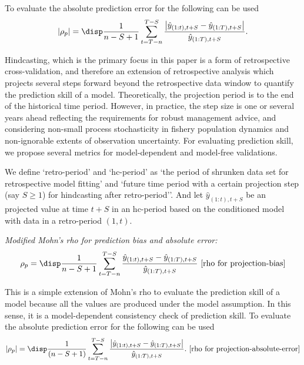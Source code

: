 To evaluate the absolute prediction error for the following can be used
\begin{equation}
\label{eqn:mohn3}
|\rho_p| = \disp \frac{1}{n-S+1} \sum_{t=T-n}^{T-S}
\frac{\left| \hat{y}_{(1:t),t+S}-\hat{y}_{(1:T),t+S} \right|}{\hat{y}_{(1:T),t+S}}. 
\end{equation} 

Hindcasting, which is the primary focus in this paper is a form of retrospective cross-validation, and therefore an extension of retrospective analysis which projects several steps forward beyond the retrospective data window to quantify the prediction skill of a model. Theoretically, the projection period is to the end of the historical time period. However, in practice, the step size is one or several years ahead reflecting the requirements for robust management advice, and considering non-small process stochasticity in fishery population dynamics and non-ignorable extents of observation uncertainty. For evaluating prediction skill, we propose several metrics for model-dependent and model-free validations.

We  define `retro-period' and `hc-period' as `the period of shrunken data set for retrospective model fitting' and `future time period with a certain projection step (say $S \geq 1$) for hindcasting after retro-period''. And let $\hat{y}_{(1:t),t+S}$ be an projected value at time $t+S$ in an hc-period based on the conditioned model with data in a retro-period $(1,t)$. 

\vspace{0.2cm} \noindent
{\it Modified Mohn's rho for prediction bias and absolute error:}\\
\begin{equation}
\label{eqn:mohn2}
\rho_p = \disp \frac{1}{n-S+1} \sum_{t=T-n}^{T-S} 
\frac{\hat{y}_{(1:t),t+S}-\hat{y}_{(1:T),t+S}}{\hat{y}_{(1:T),t+S}} 
\ \mbox{[rho for projection-bias]}
\end{equation} 

This is a simple extension of Mohn's rho to evaluate the prediction skill of a model because all the values are produced under the model assumption. In this sense, it is a model-dependent consistency check of prediction skill. To evaluate the absolute prediction error for the following can be used
\begin{equation}
\label{eqn:mohn3}
|\rho_p| = \disp \frac{1}{(n-S+1)} \sum_{t=T-n}^{T-S}
\frac{\left| \hat{y}_{(1:t),t+S}-\hat{y}_{(1:T),t+S} \right|}{\hat{y}_{(1:T),t+S}}. 
\ \mbox{[rho for projection-absolute-error]}
\end{equation} 

